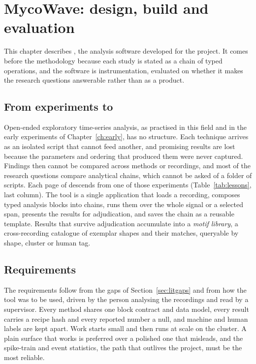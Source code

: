 \chapter{MycoWave: design, build and evaluation}
\label{ch:pipeline}

This chapter describes \tool{}, the analysis software developed for the project. It comes before the methodology because each study is stated as a chain of typed operations, and the software is instrumentation, evaluated on whether it makes the research questions answerable rather than as a product.

\section{From experiments to \tool{}}
\label{sec:pipelinemotivation}
\label{sec:lineage}

Open-ended exploratory time-series analysis, as practised in this field and in the early experiments of Chapter~\ref{ch:early}, has no structure. Each technique arrives as an isolated script that cannot feed another, and promising results are lost because the parameters and ordering that produced them were never captured. Findings then cannot be compared across methods or recordings, and most of the research questions compare analytical chains, which cannot be asked of a folder of scripts. Each page of \tool{} descends from one of those experiments (Table~\ref{tab:lessons}, last column). The tool is a single application that loads a recording, composes typed analysis blocks into chains, runs them over the whole signal or a selected span, presents the results for adjudication, and saves the chain as a reusable template. Results that survive adjudication accumulate into a \emph{motif library}, a cross-recording catalogue of exemplar shapes and their matches, queryable by shape, cluster or human tag.

\section{Requirements}
\label{sec:requirements}

The requirements follow from the gaps of Section~\ref{sec:litgaps} and from how the tool was to be used, driven by the person analysing the recordings and read by a supervisor. Every method shares one block contract and data model, every result carries a recipe hash and every reported number a null, and machine and human labels are kept apart. Work starts small and then runs at scale on the cluster. A plain surface that works is preferred over a polished one that misleads, and the spike-train and event statistics, the path that outlives the project, must be the most reliable.

